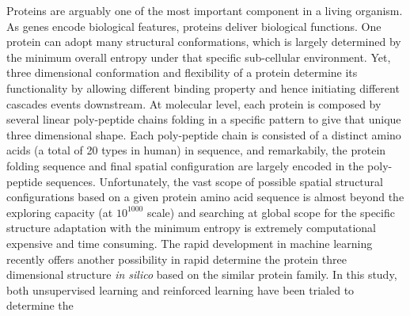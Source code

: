 Proteins are arguably one of the most important component in a living organism. As genes encode biological features, proteins deliver biological functions. One protein can adopt many structural conformations, which is largely determined by the minimum overall entropy under that specific sub-cellular environment. Yet, three dimensional conformation and flexibility of a protein determine its functionality by allowing different binding property and hence initiating different cascades events downstream. At molecular level, each protein is composed by several linear poly-peptide chains folding in a specific pattern to give that unique three dimensional shape. Each poly-peptide chain is consisted of a distinct amino acids (a total of 20 types in human) in sequence, and remarkabily, the protein folding sequence and final spatial configuration are largely encoded in the poly-peptide sequences. Unfortunately, the vast scope of possible spatial structural configurations based on a given protein amino acid sequence is almost beyond the exploring capacity (at $10^{1000}$ scale) and searching at global scope for the specific structure adaptation with the minimum entropy is extremely computational expensive and time consuming. The rapid development in machine learning recently offers another possibility in rapid determine the protein three dimensional structure \textit{in silico} based on the similar protein family. In this study, both unsupervised learning and reinforced learning have been trialed to determine the 